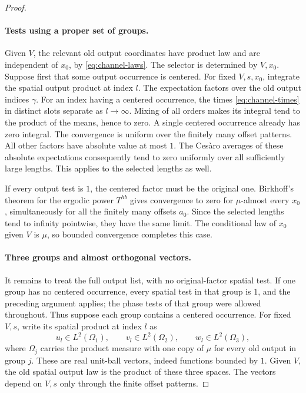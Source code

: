\begin{proof}
\paragraph{Tests using a proper set of groups.}
Given $V$, the relevant old output coordinates have product law and
are independent of $x_0$, by \eqref{eq:channel-laws}.  The selector is
determined by $V,x_0$.  Suppose first that some output occurrence is
centered.  For fixed $V,s,x_0$, integrate the spatial output product
at index $l$.  The expectation factors over the old output indices
$\gamma$.  For an index having a centered occurrence, the times
\eqref{eq:channel-times} in distinct slots separate as $l\to\infty$.
Mixing of all orders makes its integral tend to the product of the
means, hence to zero.  A single centered occurrence already has zero
integral.  The convergence is uniform over the finitely many offset
patterns.  All other factors have absolute value at most $1$.
The Ces\`aro averages of these absolute expectations consequently tend
to zero uniformly over all sufficiently large lengths.  This applies
to the selected lengths as well.

If every output test is $1$, the centered factor must be the original
one.  Birkhoff's theorem for the ergodic power $T^{hb}$ gives convergence
to zero for $\mu$-almost every $x_0$, simultaneously for all the
finitely many offsets $a_0$.  Since the selected lengths tend to
infinity pointwise, they have the same limit.  The conditional law of
$x_0$ given $V$ is $\mu$, so bounded convergence completes this case.

\paragraph{Three groups and almost orthogonal vectors.}
It remains to treat the full output list, with no original-factor
spatial test.  If one group has no centered occurrence, every spatial
test in that group is $1$, and the preceding argument applies; the
phase tests of that group were allowed throughout.  Thus suppose each
group contains a centered occurrence.  For fixed $V,s$, write its
spatial product at index $l$ as
\[
 u_l\in L^2(\Omega_1),\qquad
 v_l\in L^2(\Omega_2),\qquad
 w_l\in L^2(\Omega_3),
\]
where $\Omega_j$ carries the product measure with one copy of $\mu$
for every old output in group $j$.  These are real unit-ball vectors,
indeed functions bounded by $1$.  Given $V$, the old spatial output
law is the product of these three spaces.  The vectors depend on
$V,s$ only through the finite offset patterns.


\end{proof}
